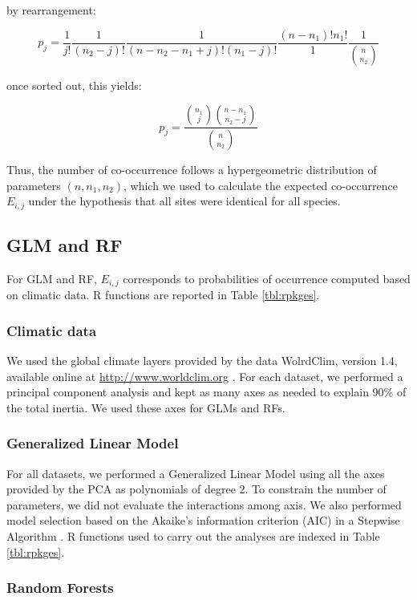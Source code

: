 by rearrangement:

\[ p_j= \frac{1}{j!} \frac{1}{(n_2-j)!} \frac{1}{(n-n_2-n_1+j)!(n_1-j)!} \frac{(n-n_1)!n_1!}{1} \frac{1}{\binom{n}{n_2}} \]

once sorted out, this yields:

\[ p_j= \frac{\binom{n_1}{j} \binom{n-n_1}{n_2-j}}{\binom{n}{n_2}} \]

Thus, the number of co-occurrence follows a hypergeometric distribution
of parameters \((n,n_1,n_2)\), which we used to calculate the expected
co-occurrence \(E_{i,j}\) under the hypothesis that all sites were
identical for all species.

\subsection{GLM and RF}\label{glm-and-rf}

For GLM and RF, \(E_{i,j}\) corresponds to probabilities of occurrence
computed based on climatic data. R functions are reported in Table
\ref{tbl:rpkges}.

\subsubsection{Climatic data}\label{climatic-data}

We used the global climate layers provided by the data WolrdClim,
version 1.4, available online at \url{http://www.worldclim.org}
\citep{Hijmans2005}. For each dataset, we performed a principal
component analysis and kept as many axes as needed to explain 90\% of
the total inertia. We used these axes for GLMs and RFs.

\subsubsection{Generalized Linear Model}\label{generalized-linear-model}

For all datasets, we performed a Generalized Linear Model
\citep{Elith2006} using all the axes provided by the PCA as polynomials
of degree 2. To constrain the number of parameters, we did not evaluate
the interactions among axis. We also performed model selection based on
the Akaike's information criterion (AIC) in a Stepwise Algorithm
\citep{burnham2013model}. R functions used to carry out the analyses are
indexed in Table \ref{tbl:rpkges}.

\subsubsection{Random Forests}\label{random-forests}

